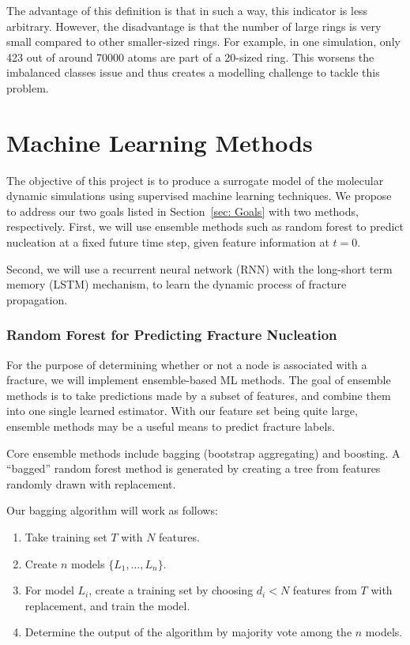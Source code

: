     The advantage of this definition is that in such a way, this indicator is less arbitrary. However, the disadvantage is that the number of large rings is very small compared to other smaller-sized rings. For example, in one simulation, only 423 out of around 70000 atoms are part of a 20-sized ring. This worsens the imbalanced classes issue and thus creates a modelling challenge to tackle this problem.



\section{Machine Learning Methods}

The objective of this project is to produce a surrogate model of the molecular dynamic simulations using supervised machine learning techniques. We propose to address our two goals listed in Section~\ref{sec: Goals} with two methods, respectively. First, we will use ensemble methods such as random forest to predict nucleation at a fixed future time step, given feature information at $t=0$.

Second, we will use a recurrent neural network (RNN) with the long-short term memory (LSTM) mechanism, to learn the dynamic process of fracture propagation.

\subsubsection{Random Forest for Predicting Fracture Nucleation}

For the purpose of determining whether or not a node is associated with a fracture, we will implement ensemble-based ML methods. The goal of ensemble methods is to take predictions made by a subset of features, and combine them into one single learned estimator. With our feature set being quite large, ensemble methods may be a useful means to predict fracture labels. 

Core ensemble methods include bagging (bootstrap aggregating) and boosting. A ``bagged'' random forest method is generated by creating a tree from features randomly drawn with replacement. 

Our bagging algorithm will work as follows:

\begin{enumerate}
\item Take training set $T$ with $N$ features.
\item Create $n$ models $\{L_1,\dots,L_n\}$.
\item For model $L_i$, create a training set by choosing $d_i<N$ features from $T$ with replacement, and train the model.
\item Determine the output of the algorithm by majority vote among the $n$ models.
\end{enumerate}

